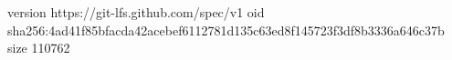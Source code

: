 version https://git-lfs.github.com/spec/v1
oid sha256:4ad41f85bfacda42acebef6112781d135c63ed8f145723f3df8b3336a646c37b
size 110762
